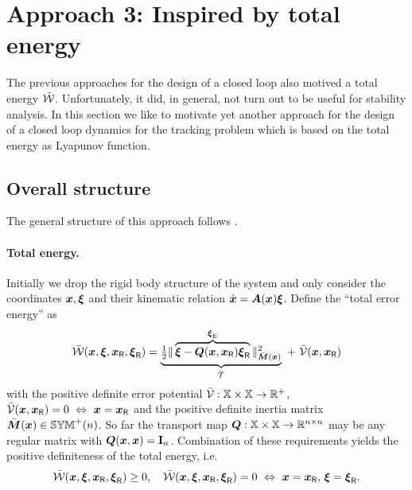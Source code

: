 \section{Approach 3: Inspired by total energy}\label{sec:CtrlApproachEnergy}
The previous approaches for the design of a closed loop also motived a total energy $\totalEnergyC$.
Unfortunately, it did, in general, not turn out to be useful for stability analysis.
In this section we like to motivate yet another approach for the design of a closed loop dynamics for the tracking problem which is based on the total energy as Lyapunov function.

\subsection{Overall structure}
The general structure of this approach follows \cite{Bullo:TrackingAutomatica}.

\paragraph*{Total energy.}
Initially we drop the rigid body structure of the system and only consider the coordinates $\sysCoord, \sysVel$ and their kinematic relation $\sysCoordd = \kinMat(\sysCoord) \sysVel$.
Define the ``total error energy'' as
\begin{align}\label{eq:DefTotalErrorEnergy}
 \totalEnergyC(\sysCoord, \sysVel, \sysCoordR, \sysVelR) = \underbrace{\tfrac{1}{2} \norm[\sysInertiaMatC(\sysCoord)]{\overbrace{\sysVel-\sysTransportMap(\sysCoord, \sysCoordR)\sysVelR}^{\sysVelE}}^2}_{\kineticEnergyC} \ + \ \potentialEnergyC(\sysCoord, \sysCoordR)
\end{align}
with the positive definite error potential $\potentialEnergyC: \configSpace \times \configSpace \rightarrow \RealNumP$, $\potentialEnergyC(\sysCoord, \sysCoordR) = 0 \ \Leftrightarrow \ \sysCoord = \sysCoordR$ and the positive definite inertia matrix $\sysInertiaMatC(\sysCoord)\in\SymMatP(\dimConfigSpace)$.
So far the transport map $\sysTransportMap: \configSpace \times \configSpace \rightarrow \RealNum^{\dimConfigSpace\times\dimConfigSpace}$ may be any regular matrix with $\sysTransportMap(\sysCoord, \sysCoord) = \idMat[\dimConfigSpace]$.
Combination of these requirements yields the positive definiteness of the total energy, i.e.
\begin{align}
 \totalEnergyC(\sysCoord, \sysVel, \sysCoordR, \sysVelR) \geq 0, \quad \totalEnergyC(\sysCoord, \sysVel, \sysCoordR, \sysVelR) = 0 \ \Leftrightarrow \ \sysCoord = \sysCoordR,\, \sysVel = \sysVelR.
\end{align}

